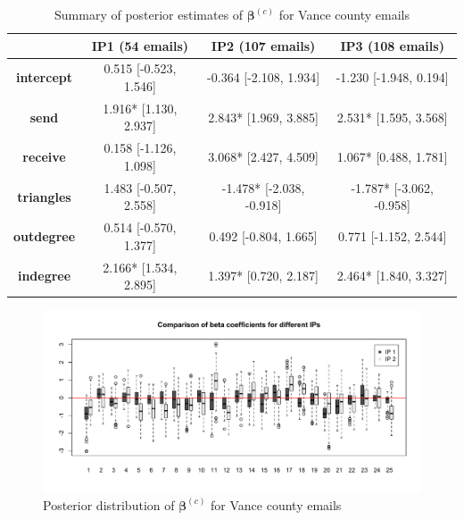 \documentclass[a4paper]{article}
\begin{document}
\begin{table}[ht]
	\centering
	\begin{tabular}{|c|c|c|c|} 
		\hline
		& \textbf{IP1} (54 emails) & \textbf{IP2} (107 emails) &\textbf{IP3} (108 emails) \\
		\hline
		\textbf{intercept} & 0.515 [-0.523, 1.546]& -0.364 [-2.108, 1.934]& -1.230 [-1.948, 0.194]\\
		\textbf{send}&  1.916* [1.130, 2.937]& 2.843* [1.969, 3.885]& 2.531* [1.595, 3.568]\\
		\textbf{receive}& 0.158 [-1.126, 1.098]& 3.068* [2.427, 4.509]& 1.067* [0.488, 1.781]\\
		\textbf{triangles} & 1.483 [-0.507, 2.558]& -1.478* [-2.038, -0.918]& -1.787* [-3.062, -0.958]\\
		\textbf{outdegree} & 0.514 [-0.570, 1.377]& 0.492 [-0.804, 1.665]& 0.771 [-1.152, 2.544]\\
		\textbf{indegree} & 2.166* [1.534, 2.895]& 1.397* [0.720, 2.187]& 2.464* [1.840, 3.327]\\
						\hline
	\end{tabular}
	\caption {Summary of posterior estimates of $\boldsymbol{\beta}^{(c)}$ for Vance county emails}
	\label{table:Vancebeta}
\end{table}
\begin{figure}[ht]
	\centering
	\includegraphics[width=1\textwidth]{betaplot.pdf} 
	\caption{Posterior distribution of  $\boldsymbol{\beta}^{(c)}$ for Vance county emails}
	\label{fig:Vanceboxplot}
\end{figure}
\end{document}
